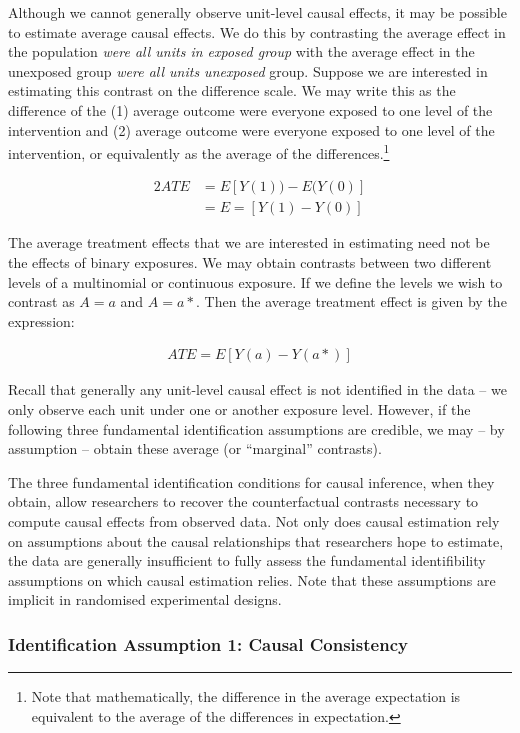 \documentclass[
  singlecolumn]{report}
\begin{document}
Although we cannot generally observe unit-level causal effects, it may
be possible to estimate average causal effects. We do this by
contrasting the average effect in the population \emph{were all units in
exposed group} with the average effect in the unexposed group \emph{were
all units unexposed} group. Suppose we are interested in estimating this
contrast on the difference scale. We may write this as the difference of
the (1) average outcome were everyone exposed to one level of the
intervention and (2) average outcome were everyone exposed to one level
of the intervention, or equivalently as the average of the
differences.\footnote{Note that mathematically, the difference in the
  average expectation is equivalent to the average of the differences in
  expectation.}

\begin{alignat*}{2}
ATE & = E[Y(1)) - E(Y(0)]\\
& = E=[Y(1) - Y(0)]
\end{alignat*}

The average treatment effects that we are interested in estimating need
not be the effects of binary exposures. We may obtain contrasts between
two different levels of a multinomial or continuous exposure. If we
define the levels we wish to contrast as \(A = a\) and \(A = a*\). Then
the average treatment effect is given by the expression:

   \begin{align*}
    ATE = E[Y(a) - Y(a*)]
    \end{align*}

Recall that generally any unit-level causal effect is not identified in
the data -- we only observe each unit under one or another exposure
level. However, if the following three fundamental identification
assumptions are credible, we may -- by assumption -- obtain these
average (or ``marginal'' contrasts).

The three fundamental identification conditions for causal inference,
when they obtain, allow researchers to recover the counterfactual
contrasts necessary to compute causal effects from observed data. Not
only does causal estimation rely on assumptions about the causal
relationships that researchers hope to estimate, the data are generally
insufficient to fully assess the fundamental identifibility assumptions
on which causal estimation relies. Note that these assumptions are
implicit in randomised experimental designs.

\hypertarget{identification-assumption-1-causal-consistency}{%
\subsubsection{Identification Assumption 1: Causal
Consistency}\label{identification-assumption-1-causal-consistency}}
\end{document}
